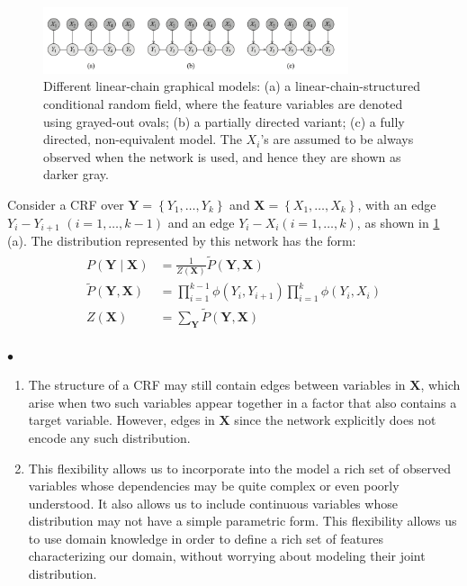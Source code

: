 \documentclass{article}
\begin{document}
\begin{exma}\label{ex:mdnfa}
\begin{figure}[H]
    \centering
    \includegraphics[width=0.8\textwidth]{Figs/a24.png}
    \caption{Different linear-chain graphical models: (a) a linear-chain-structured conditional random ﬁeld, where the feature variables are denoted using grayed-out ovals; (b) a partially directed variant; (c) a fully directed, non-equivalent model. The $X_i$'s are assumed to be always observed when the network is used, and hence they are shown as darker gray.}
    \label{fig:oerkla}
\end{figure}
Consider a CRF over $\boldsymbol{Y}=\left\{Y_{1}, \ldots, Y_{k}\right\}$ and $\boldsymbol{X}=\left\{X_{1}, \ldots, X_{k}\right\}$, with an edge $Y_{i}-Y_{i+1}$ $(i=1, \ldots, k-1)$ and an edge $Y_{i}-X_{i}(i=1, \ldots, k)$, as shown in \cref{fig:oerkla} (a). The distribution represented by this network has the form:
\begin{align*}
\begin{aligned}
P(\boldsymbol{Y} \mid \boldsymbol{X}) &=\frac{1}{Z(\boldsymbol{X})} \tilde{P}(\boldsymbol{Y}, \boldsymbol{X}) \\
\tilde{P}(\boldsymbol{Y}, \boldsymbol{X}) &=\prod_{i=1}^{k-1} \phi\left(Y_{i}, Y_{i+1}\right) \prod_{i=1}^{k} \phi\left(Y_{i}, X_{i}\right) \\
Z(\boldsymbol{X}) &=\sum_{\boldsymbol{Y}} \tilde{P}(\boldsymbol{Y}, \boldsymbol{X})
\end{aligned}
\end{align*}
\end{exma}
$\bullet$ 
\begin{enumerate}
    \item {} The structure of a CRF may still contain edges between variables in $\boldsymbol{X}$, which arise when two such variables appear together in a factor that also contains a target variable. However, edges in $\boldsymbol{X}$  since the network explicitly does not encode any such distribution.
    \item {} This flexibility allows us to incorporate into the model a rich set of observed variables whose dependencies may be quite complex or even poorly understood. It also allows us to include continuous variables whose distribution may not have a simple parametric form. This flexibility allows us to use domain knowledge in order to define a rich set of features characterizing our domain, without worrying about modeling their joint distribution. 
\end{enumerate}
\end{document}
